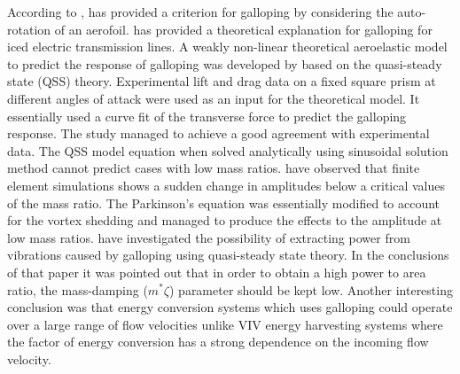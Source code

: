 According to \cite{Paidoussis2010}, \cite{Glauert1919} has provided a criterion for galloping by considering the auto-rotation of an aerofoil.  \cite{DenHartog1956}  has provided a theoretical explanation for galloping for iced electric transmission lines. A weakly non-linear theoretical aeroelastic model to predict the response of galloping was developed by \cite{Parkinson1964} based on the quasi-steady state (QSS) theory. Experimental lift and drag data on a fixed square prism at different angles of attack were used as an input for the theoretical model. It essentially used a curve fit of the transverse force to predict the galloping response. The study managed to achieve a good agreement with experimental data. The QSS model equation when solved analytically using sinusoidal solution method cannot predict cases with low mass ratios. \cite{Joly2012} have observed that finite element simulations shows a sudden change in amplitudes  below a critical values of the mass ratio. The Parkinson's equation was essentially modified to account for the vortex shedding and managed to produce the effects to the amplitude at low mass ratios.
\cite{Barrero-Gil2010a} have investigated the possibility of extracting power from vibrations caused by galloping using quasi-steady state theory. In the conclusions of that paper it was pointed out that in order to obtain a high power to area ratio, the mass-damping ($m^*\zeta$) parameter should be kept low. Another interesting conclusion was that energy conversion systems which uses galloping could operate over  a large range of flow velocities unlike VIV energy harvesting systems where the factor of energy conversion has a strong dependence on the incoming flow velocity. 